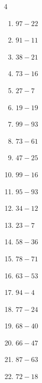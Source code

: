 \begin{multicols}{4}
\begin{enumerate}
  \item $97-22$
        \phantom{$=75$}

  \item $91-11$
        \phantom{$=80$}

  \item $38-21$
        \phantom{$=17$}

  \item $73-16$
        \phantom{$=57$}

  \item $27-7$
        \phantom{$=20$}

  \item $19-19$
        \phantom{$=0$}

  \item $99-93$
        \phantom{$=6$}

  \item $73-61$
        \phantom{$=12$}

  \item $47-25$
        \phantom{$=22$}

  \item $99-16$
        \phantom{$=83$}

  \item $95-93$
        \phantom{$=2$}

  \item $34-12$
        \phantom{$=22$}

  \item $23-7$
        \phantom{$=16$}

  \item $58-36$
        \phantom{$=22$}

  \item $78-71$
        \phantom{$=7$}

  \item $63-53$
        \phantom{$=10$}

  \item $94-4$
        \phantom{$=90$}

  \item $77-24$
        \phantom{$=53$}

  \item $68-40$
        \phantom{$=28$}

  \item $66-47$
        \phantom{$=19$}

  \item $87-63$
        \phantom{$=24$}

  \item $72-18$
        \phantom{$=54$}


\end{enumerate}
\end{multicols}
